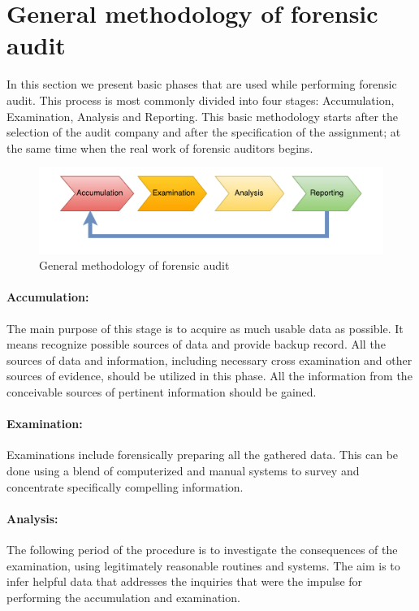 \section{General methodology of forensic audit}
In this section we present basic phases that are used while performing forensic audit. This process is most commonly divided into four stages: Accumulation, Examination, Analysis and Reporting. This basic methodology starts after the  selection of the audit company and after the specification of the assignment; at the same time when the real work of forensic auditors begins.

\begin{figure}[h]
	\begin{center} 
	\includegraphics[width=1.0\textwidth]{img/general_methodology.pdf}
	\end{center}
	\caption{General methodology of forensic audit}
\end{figure}

\paragraph{Accumulation:} 
The main purpose of this stage is to acquire as much usable data as possible. It means recognize possible sources of data and provide backup record. All the sources of data and information, including necessary cross examination and other sources of evidence, should be utilized in this phase. All the information from the conceivable sources of pertinent information should be gained.

\paragraph{Examination:}
Examinations include forensically preparing all the gathered data. This can be done using a blend of computerized and manual systems to survey and concentrate specifically compelling information. 

\paragraph{Analysis:}
The following period of the procedure is to investigate the consequences of the examination, using legitimately reasonable routines and systems. The aim is to infer helpful data that addresses the inquiries that were the impulse for performing the accumulation and examination. 


